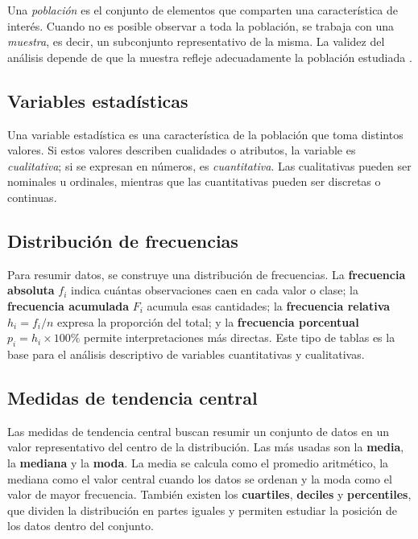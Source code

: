 \documentclass[12pt,letterpaper]{article}
\begin{document}
Una \textit{población} es el conjunto de elementos que comparten una característica de interés. Cuando no es posible observar a toda la población, se trabaja con una \textit{muestra}, es decir, un subconjunto representativo de la misma. La validez del análisis depende de que la muestra refleje adecuadamente la población estudiada \parencite{cordova2003}.

\subsection{Variables estadísticas}

Una variable estadística es una característica de la población que toma distintos valores. Si estos valores describen cualidades o atributos, la variable es \textit{cualitativa}; si se expresan en números, es \textit{cuantitativa}. Las cualitativas pueden ser nominales u ordinales, mientras que las cuantitativas pueden ser discretas o continuas.

\subsection{Distribución de frecuencias}

Para resumir datos, se construye una distribución de frecuencias. La \textbf{frecuencia absoluta} $f_i$ indica cuántas observaciones caen en cada valor o clase; la \textbf{frecuencia acumulada} $F_i$ acumula esas cantidades; la \textbf{frecuencia relativa} $h_i = f_i/n$ expresa la proporción del total; y la \textbf{frecuencia porcentual} $p_i = h_i \times 100\%$ permite interpretaciones más directas. Este tipo de tablas es la base para el análisis descriptivo de variables cuantitativas y cualitativas.

\subsection{Medidas de tendencia central}

Las medidas de tendencia central buscan resumir un conjunto de datos en un valor representativo del centro de la distribución. Las más usadas son la \textbf{media}, la \textbf{mediana} y la \textbf{moda}. La media se calcula como el promedio aritmético, la mediana como el valor central cuando los datos se ordenan y la moda como el valor de mayor frecuencia. También existen los \textbf{cuartiles}, \textbf{deciles} y \textbf{percentiles}, que dividen la distribución en partes iguales y permiten estudiar la posición de los datos dentro del conjunto.
\end{document}
